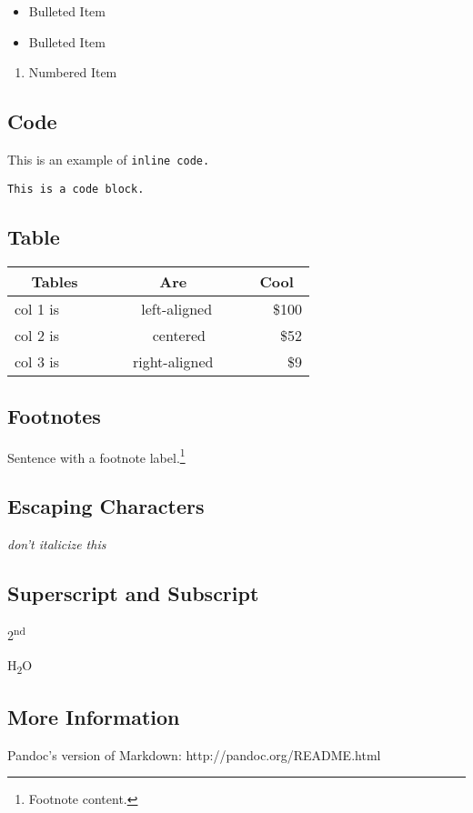 \begin{itemize}
\item
  Bulleted Item\\
\item
  Bulleted Item\\
\end{itemize}

\begin{enumerate}
\def\labelenumi{\arabic{enumi}.}
\setcounter{enumi}{1}
\tightlist
\item
  Numbered Item
\end{enumerate}

\subsection{Code}

This is an example of \texttt{inline\ code.}

\texttt{This\ is\ a\ code\ block.}

\subsection{Table}

\begin{longtable}[]{@{}lcr@{}}
\toprule
~~Tables~~ & ~~~~~~Are~~~~~~ & ~Cool~\tabularnewline
\midrule
\endhead
col 1 is & ~left-aligned & \$100\tabularnewline
col 2 is & ~~~ centered~~ & ~\$52\tabularnewline
col 3 is & right-aligned & ~~\$9\tabularnewline
\bottomrule
\end{longtable}

\subsection{Footnotes}

Sentence with a footnote label.\footnote{Footnote content.}

\subsection{Escaping Characters}

\emph{don't italicize this}

\subsection{Superscript and Subscript}

2\textsuperscript{nd}

H\textsubscript{2}O

\subsection{More Information}

Pandoc's version of Markdown: http://pandoc.org/README.html
